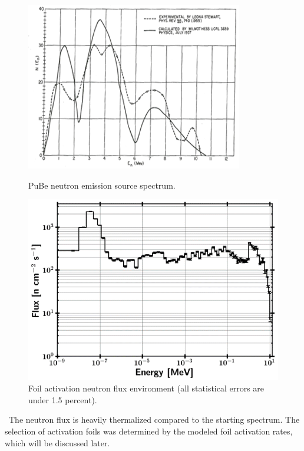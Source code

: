 \documentclass[journal]{IEEEtran}
\let\MYoriglatexcaption\caption
\renewcommand{\caption}[2][\relax]{\MYoriglatexcaption[#2]{#2}}
\begin{document}
	\begin{figure}[h!]
	\includegraphics[width=\linewidth]{Figures/PuBe.png}
	\caption{PuBe neutron emission source spectrum.}
	\label{fig:PuBE}

	\vskip 0.25cm

	\includegraphics[width=\linewidth]{Figures/PileSpec.png}
	\caption{Foil activation neutron flux environment (all statistical errors are under 1.5 percent).}
	\label{fig:Spec1}
	\end{figure}

	\ The neutron flux is heavily thermalized compared to the starting spectrum. 
The selection of activation foils was determined by the modeled foil activation rates, which will be discussed later. 
	
\end{document}
